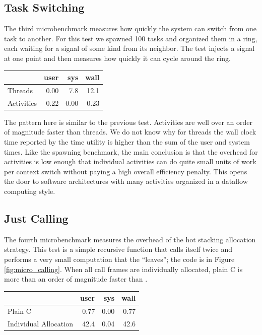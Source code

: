 \documentclass[pldi,10pt,preprint]{sigplanconf-pldi16}
\begin{document}
\subsection{Task Switching}

The third microbenchmark measures how quickly the system can switch from one task to another.
For this test we spawned 100 tasks and organized them in a ring, each waiting for a signal of some kind from its neighbor.
The test injects a signal at one point and then measures how quickly it can cycle around the ring.

\vspace{1em}
\begin{tabular}{|l|r|r|r|}
  \hline
   & user & sys & wall \\
  \hline
  \hline
  Threads & 0.00 & 7.8 & 12.1 \\
  \hline
  Activities & 0.22 & 0.00 & 0.23 \\
  \hline
\end{tabular}
\vspace{1em}

The pattern here is similar to the previous test.
Activities are well over an order of magnitude faster than threads.
We do not know why for threads the wall clock time reported by the time utility is higher than the sum of the user and system times.
Like the spawning benchmark, the main conclusion is that the overhead for activities is low enough that individual activities can do quite small units of work per context switch without paying a high overall efficiency penalty.
This opens the door to software architectures with many activities organized in a dataflow computing style.

\subsection{Just Calling}

The fourth microbenchmark measures the overhead of the hot stacking allocation strategy.
This test is a simple recursive function that calls itself twice and performs a very small computation that the ``leaves''; the code is in Figure \ref{fig:micro_calling}.
When all call frames are individually allocated, plain C is more than an order of magnitude faster than \charcoal{}.

\vspace{1em}
\begin{tabular}{|l|r|r|r|}
  \hline
   & user & sys & wall \\
  \hline
  \hline
  Plain C & 0.77 & 0.00 & 0.77 \\
  \hline
  Individual Allocation & 42.4 & 0.04 & 42.6 \\
  \hline
\end{tabular}
\vspace{1em}
\end{document}
